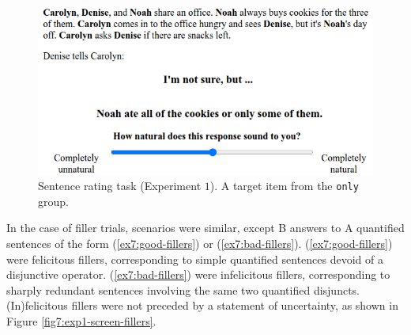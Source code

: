 \begin{figure}[H]
	\centering
	\includegraphics[width=.5\linewidth]{./images/exp1-screen-target.png}
	\caption[]{Sentence rating task (Experiment $1$). A target item from the \texttt{only} group.}\label{fig7:exp1-screen-target}
\end{figure}

In the case of filler trials, scenarios were similar, except B answers to A quantified sentences of the form (\ref{ex7:good-fillers}) or (\ref{ex7:bad-fillers}). (\ref{ex7:good-fillers}) were felicitous fillers, corresponding to simple quantified sentences devoid of a disjunctive operator. (\ref{ex7:bad-fillers}) were infelicitous fillers, corresponding to sharply redundant sentences involving the same two quantified disjuncts. (In)felicitous fillers were not preceded by a statement of uncertainty, as shown in Figure \ref{fig7:exp1-screen-fillers}.

\begin{exe}
	\ex \label{ex7:good-fillers}
	\begin{xlist}
		\label{ex7:good-filler-some}
		\label{ex7:good-filler-all}
	\end{xlist}
	\ex \label{ex7:bad-fillers}
	\begin{xlist}
		\label{ex7:bad-filler-some}
		\label{ex7:bad-filler-all}
	\end{xlist}
	
\end{exe}

